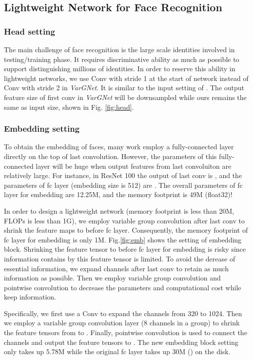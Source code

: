 \documentclass[10pt,twocolumn,letterpaper]{article}
\begin{document}
\subsection{Lightweight Network for Face Recognition}
\subsubsection{Head setting}
The main challenge of face recognition is the large scale identities involved in testing/training phase. It requires discriminative ability as much as possible to support distinguishing millions of identities. In order to reserve this ability in lightweight networks, we use  Conv with stride 1 at the start of network instead of  Conv with stride 2 in \textit{VarGNet}. It is similar to the input setting of \cite{arcface}. The output feature size of first conv in  \textit{VarGNet} will be downsampled while ours remains the same as input size, shown in Fig. \ref{fig:head}.

\subsubsection{Embedding setting}
To obtain the embedding of faces, many work \cite{arcface,sphereface}  employ a fully-connected layer directly on the top of last convolution. However, the parameters of this fully-connected layer will be huge when output features from last convoluiton are relatively large. For instance, in ResNet 100 \cite{arcface} the output of last conv is , and the parameters of fc layer (embedding size is 512) are . The overall parameters of fc layer for embedding are  12.25M, and the memory footprint is 49M (float32)!

In order to design a lightweight network (memory footprint is less than 20M, FLOPs is less than 1G), we employ variable group convolution after last conv to shrink the feature maps to  before fc layer. Consequently, the memory footprint of fc layer for embedding is only 1M.  Fig.\ref{fig:emb} shows the setting of embedding block. Shrinking the feature tensor to  before fc layer for embedding is risky since information contains by this feature tensor is limited. To avoid the derease of essential information, we expand channels after last conv to retain as much information as possible. Then we employ variable group convolution and pointwise convolution to decrease the parameters and computational cost while keep information.


Specifically, we first use a  Conv to expand the channels from 320 to 1024. Then we employ a  variable group convolution layer (8 channels in a group) to shrink the feature tensors from  to . Finally, pointwise convolution is used to connect the channels and output the feature tensors to . The new embedding block setting  only takes up 5.78M while the original fc layer takes up 30M () on the disk.
\end{document}
